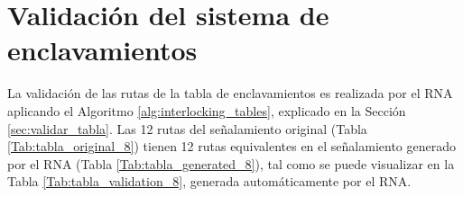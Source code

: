 \section{Validación del sistema de enclavamientos}

    La validación de las rutas de la tabla de enclavamientos es realizada por el RNA aplicando el Algoritmo \ref{alg:interlocking_tables}, explicado en la Sección \ref{sec:validar_tabla}. Las 12 rutas del señalamiento original (Tabla \ref{Tab:tabla_original_8}) tienen 12 rutas equivalentes en el señalamiento generado por el RNA (Tabla \ref{Tab:tabla_generated_8}), tal como se puede visualizar en la Tabla \ref{Tab:tabla_validation_8}, generada automáticamente por el RNA.

    \begin{table}[H]
        {
        \caption{Equivalencias entre las rutas originales y las generadas por el RNA.}
        \label{Tab:tabla_validation_8}
        \centering
            \begin{center}
            \end{center}
        }    
    \end{table}
    
